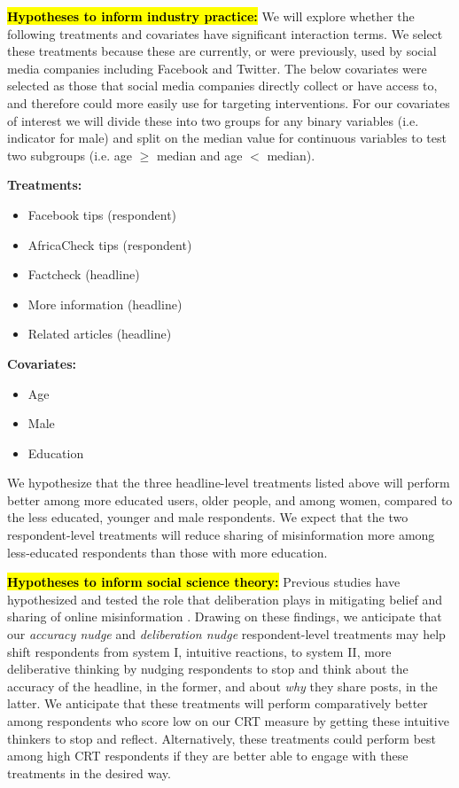 \documentclass[letterpaper, 12pt, parskip=full,]{scrartcl}
\begin{document}
\hl{\textbf{Hypotheses to inform industry practice:}}
We will explore whether the following treatments and covariates have significant interaction terms. We select these treatments because these are currently, or were previously, used by social media companies including Facebook and Twitter. The below covariates were selected as those that social media companies directly collect or have access to, and therefore could more easily use for targeting interventions. For our covariates of interest we will divide these into two groups for any binary variables (i.e. indicator for male) and split on the median value for continuous variables to test two subgroups (i.e. age $\geq$ median and age $<$ median). 

\textbf{Treatments:}
\begin{itemize}
\item Facebook tips (respondent)
\item AfricaCheck tips (respondent)
\item Factcheck (headline)
\item More information (headline)
\item Related articles (headline)
\end{itemize}

\textbf{Covariates:}
\begin{itemize}
\item Age
\item Male
\item Education
\end{itemize}

We hypothesize that the three headline-level treatments listed above will perform better among more educated users, older people, and among women, compared to the less educated, younger and male respondents. We expect that the two respondent-level treatments will reduce sharing of misinformation more among less-educated respondents than those with more education. %

\hl{\textbf{Hypotheses to inform social science theory:}} Previous studies have hypothesized and tested the role that deliberation plays in mitigating belief and sharing of online misinformation \citep{bago2020fake,pennycook2020fighting}. Drawing on these findings, we anticipate that our \textit{accuracy nudge} and \textit{deliberation nudge} respondent-level treatments may help shift respondents from system I, intuitive reactions, to system II, more deliberative thinking by nudging respondents to stop and think about the accuracy of the headline, in the former, and about \textit{why} they share posts, in the latter. We anticipate that these treatments will perform comparatively better among respondents who score low on our CRT measure by getting these intuitive thinkers to stop and reflect. Alternatively, these treatments could perform best among high CRT respondents if they are better able to engage with these treatments in the desired way. 
\end{document}
